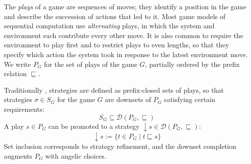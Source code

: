 \documentclass[draft,11pt]{report}
\begin{document}
The \emph{plays} of a game are sequences of moves;
they identify a position in the game
and describe the succession of actions that led to it.
Most game models of sequential computation
use \emph{alternating} plays,
in which
the system and environment each contribute
every other move.
It is also common to require the environment to play first
and to restrict plays to even lengths,
so that they specify which action the system took
in response to the latest environment move.
We write $P_G$ for the set of plays of the game $G$,
partially ordered by the prefix relation $\sqsubseteq$.

Traditionally \cite{gamesem99},
strategies are defined as
prefix-closed sets of plays,
so that strategies $\sigma \in S_G$
for the game $G$ are downsets of $P_G$
satisfying certain requirements:
\[
    S_G \subseteq
    \mathcal{D}(P_G, {\sqsubseteq})
\]
%
A play $s \in P_G$ can be promoted to a strategy
${\downarrow} s \in \mathcal{D}(P_G, {\sqsubseteq})$:
\[
    {\downarrow} s := \{ t \in P_G \mid t \sqsubseteq s \}
\]
Set inclusion corresponds to strategy refinement, %
and the downset completion augments $P_G$ with
angelic choices.
\end{document}
